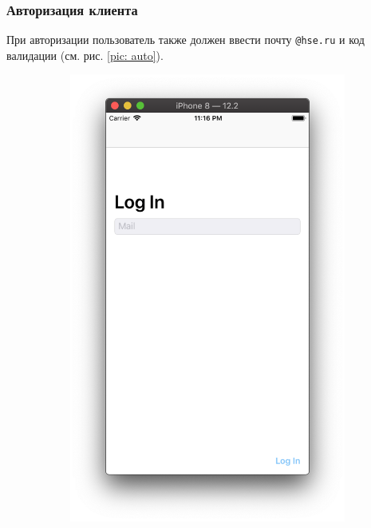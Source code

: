 \documentclass[a4paper,12pt]{article}
\begin{document}
	\subsubsection{Авторизация клиента}
	При авторизации пользователь также должен ввести почту \verb|@hse.ru| и код валидации (см. рис. \ref{pic: auto}).
	\begin{figure}[h!]
		\centering
		\begin{subfigure}[b]{0.3\linewidth}
			\includegraphics[width=\linewidth]{../includes/pmi/login.png}
		\end{subfigure}
		\begin{subfigure}[b]{0.3\linewidth}

\end{subfigure}
\end{figure}
\end{document}
